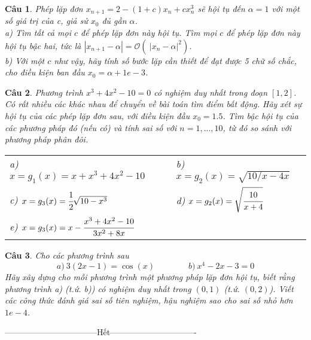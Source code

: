 \documentclass[11pt]{article}
\newtheorem{bt}{Câu}
\begin{document}
\begin{bt} %
Phép lặp đơn $x_{n+1}=2-(1+c)x_n + c x_n^3$ sẽ hội tụ đến $\alpha=1$ với một số giá trị của c, giả sử $x_0$ đủ gần $\alpha$. \\
a) Tìm tất cả mọi $c$ để phép lặp đơn này hội tụ. Tìm mọi $c$ để phép lặp đơn này hội tụ bậc hai, tức là $|x_{n+1}-\alpha| = \mathcal{O} (\ |x_n-\alpha|^2)$. \\
b) Với một $c$ như vậy, hãy tính số bước lặp cần thiết để đạt được 5 chữ số chắc, cho điều kiện ban đầu $x_0=\alpha + 1e-3$.  
\end{bt}

\begin{bt} 
Phương trình $x^3+4x^2-10=0$ có nghiệm duy nhất trong đoạn $[1, 2]$. Có rất nhiều các khác nhau để chuyển về bài toán tìm điểm bất động. Hãy xét sự hội tụ của các phép lặp đơn sau, với điều kiện đầu $x_0=1.5$. Tìm bậc hội tụ của các phương pháp đó (nếu có) và tính sai số với $n=1,...,10$, từ đó so sánh với phương pháp phân đôi.\\
%
\begin{tabular}{lll}
a) $x=g_1(x)=x+x^3+4x^2-10$	&  & b) $x=g_2(x) = \sqrt{10/x - 4x}$ \\ 
c) $x=g_3(x)=\cfrac{1}{2}\sqrt{10-x^3}$	&  &  d) $x=g_2(x) = \sqrt{\cfrac{10}{x+4}}$ \\ 
e) $x=g_3(x)=x-\cfrac{x^3+4x^2-10}{3x^2+8x}$	&  &  \\ 
\end{tabular} 
%	
\end{bt}

\begin{bt}
Cho các phương trình sau
%
\[ a) \ 3(2x-1)= \cos(x) \qquad \qquad b) \ x^4-2x-3=0  \]
%
Hãy xây dựng cho mỗi phương trình một phương pháp lặp đơn hội tụ, biết rằng phương trình a) (t.ứ. b)) có nghiệm duy nhất trong $(0,1)$ (t.ứ. $(0,2)$). Viết các công thức đánh giá sai số tiên nghiệm, hậu nghiệm sao cho sai số nhỏ hơn $1e-4$.
\end{bt}

\centerline{———————————Hết——————————-}
\end{document}
